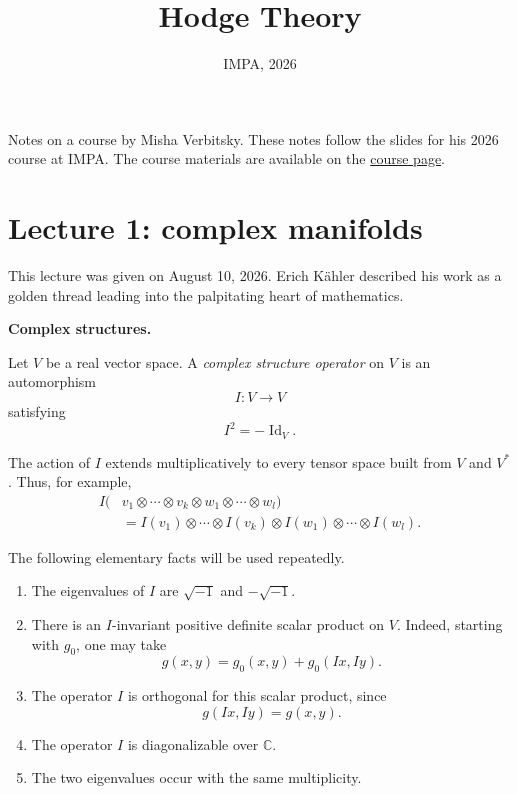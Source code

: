 



\title{Hodge Theory}
\date{IMPA, 2026}
\maketitle

\label{section-phantom}

\tableofcontents

Notes on a course by Misha Verbitsky. These
notes follow the slides for his 2026 course
at IMPA. The
course materials are available on the
\href{%
http://verbit.ru/IMPA/Kahler-2026/%
}{course page}.

\section{Lecture 1: complex manifolds}
\label{section-lecture-one-complex}

\noindent
This lecture was given on August 10,
2026. Erich K\"ahler described his work
as a golden thread leading into the
palpitating heart of mathematics.

\medskip\noindent
{\bf Complex structures.}

\begin{definition}
\label{definition-complex-operator}
Let $V$ be a real vector space. A
{\it complex structure operator} on $V$
is an automorphism
$$
I:V\longrightarrow V
$$
satisfying
$$
I^2=-\operatorname{Id}_V.
$$
\end{definition}

The action of $I$ extends
multiplicatively to every tensor space
built from $V$ and $V^*$. Thus, for
example,
$$
\begin{aligned}
I(&v_1\otimes\cdots\otimes v_k
\otimes w_1\otimes\cdots\otimes w_l)
\\
&=I(v_1)\otimes\cdots\otimes I(v_k)
\otimes I(w_1)\otimes\cdots\otimes
I(w_l).
\end{aligned}
$$

The following elementary facts will be
used repeatedly.

\begin{enumerate}
\item The eigenvalues of $I$ are
$\sqrt{-1}$ and $-\sqrt{-1}$.

\item There is an $I$-invariant positive
definite scalar product on $V$. Indeed,
starting with $g_0$, one may take
$$
g(x,y)=g_0(x,y)+g_0(Ix,Iy).
$$

\item The operator $I$ is orthogonal for
this scalar product, since
$$
g(Ix,Iy)=g(x,y).
$$

\item The operator $I$ is diagonalizable
over $\mathbb{C}$.

\item The two eigenvalues occur with the
same multiplicity.
\end{enumerate}

